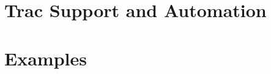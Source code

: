 \documentclass[10pt,DIV16,a4paper,abstract=true,twoside=semi,openright]
{scrreprt}
\begin{document}
\chapter{Trac Support and Automation}
\label{cha:trac}







\chapter{Examples}
\label{cha:examples}







% 


{\small
  
  
}
\end{document}
